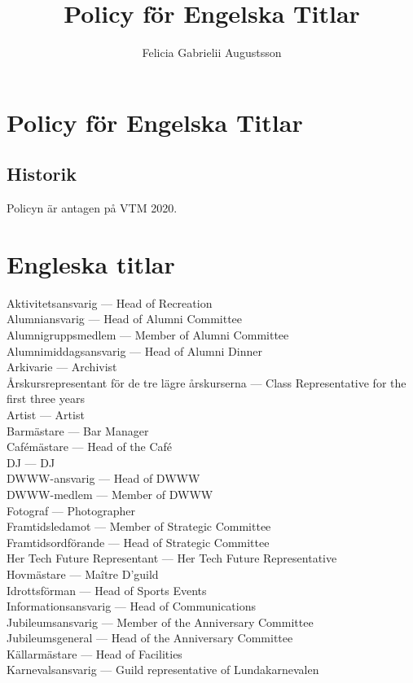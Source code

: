 \documentclass{dsekkallelse}
\title{Policy för Engelska Titlar}
\author{Felicia Gabrielii Augustsson}
\begin{document}
\section{Policy för Engelska Titlar}

\subsection{Historik}
Policyn är antagen på VTM 2020. 

\section{Engleska titlar}
Aktivitetsansvarig ---	Head of Recreation \\
Alumniansvarig ---	Head of Alumni Committee\\
Alumnigruppsmedlem ---	Member of Alumni Committee\\
Alumnimiddagsansvarig ---	Head of Alumni Dinner\\
Arkivarie ---	Archivist\\
Årskursrepresentant för de tre lägre årskurserna ---	Class Representative for the first three years\\
Artist ---	Artist\\
Barmästare ---	Bar Manager\\
Cafémästare ---	Head of the Café\\
DJ ---	DJ\\
DWWW-ansvarig ---	Head of DWWW\\
DWWW-medlem ---	Member of DWWW\\
Fotograf ---	Photographer\\
Framtidsledamot ---	Member of Strategic Committee\\
Framtidsordförande ---	Head of Strategic Committee\\
Her Tech Future Representant ---	Her Tech Future Representative\\
Hovmästare ---	Maître D'guild\\
Idrottsförman ---	Head of Sports Events\\
Informationsansvarig ---	Head of Communications\\
Jubileumsansvarig ---	Member of the Anniversary Committee\\
Jubileumsgeneral ---	Head of the Anniversary Committee\\
Källarmästare ---	Head of Facilities\\
Karnevalsansvarig ---	Guild representative of Lundakarnevalen\\
\end{document}
